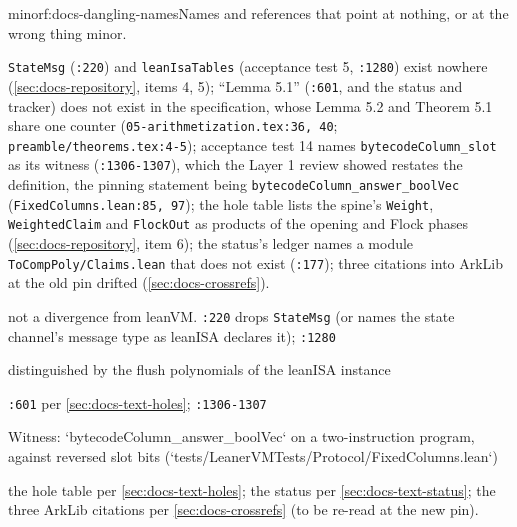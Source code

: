 \begin{finding}{minor}{f:docs-dangling-names}{Names and references that point at nothing, or at the wrong thing}
 minor.
 \begin{sloppypar}
\texttt{StateMsg} (\texttt{:\allowbreak{}220}) and \texttt{leanIsaTables} (acceptance test 5, \texttt{:\allowbreak{}1280}) exist nowhere (\cref{sec:docs-repository}, items 4, 5); ``Lemma 5.1'' (\texttt{:\allowbreak{}601}, and the status and tracker) does not exist in the specification, whose Lemma 5.2 and Theorem 5.1 share one counter (\texttt{05-\allowbreak{}arithmetization.\allowbreak{}tex:\allowbreak{}36,\allowbreak{} 40}; \texttt{preamble/\allowbreak{}theorems.\allowbreak{}tex:\allowbreak{}4-\allowbreak{}5}); acceptance test 14 names \texttt{bytecode\allowbreak{}Column\_\allowbreak{}slot} as its witness (\texttt{:\allowbreak{}1306-\allowbreak{}1307}), which the Layer 1 review showed restates the definition, the pinning statement being \texttt{bytecode\allowbreak{}Column\_\allowbreak{}answer\_\allowbreak{}bool\allowbreak{}Vec} (\texttt{Fixed\allowbreak{}Columns.\allowbreak{}lean:\allowbreak{}85,\allowbreak{} 97}); the hole table lists the spine's \texttt{Weight}, \texttt{WeightedClaim} and \texttt{FlockOut} as products of the opening and Flock phases (\cref{sec:docs-repository}, item 6); the status's ledger names a module \texttt{To\allowbreak{}Comp\allowbreak{}Poly/\allowbreak{}Claims.\allowbreak{}lean} that does not exist (\texttt{:\allowbreak{}177}); three citations into ArkLib at the old pin drifted (\cref{sec:docs-crossrefs}).
\end{sloppypar}
 not a divergence from leanVM.
 \texttt{:\allowbreak{}220} drops \texttt{StateMsg} (or names the state channel's message type as leanISA declares it); \texttt{:\allowbreak{}1280}

\begin{srccode}
distinguished by the flush polynomials of the leanISA instance
\end{srccode}

\texttt{:\allowbreak{}601} per \cref{sec:docs-text-holes}; \texttt{:\allowbreak{}1306-\allowbreak{}1307}

\begin{srccode}
Witness: `bytecodeColumn_answer_boolVec` on a two-instruction program, against reversed slot bits (`tests/LeanerVMTests/Protocol/FixedColumns.lean`)
\end{srccode}

the hole table per \cref{sec:docs-text-holes}; the status per \cref{sec:docs-text-status}; the three ArkLib citations per \cref{sec:docs-crossrefs} (to be re-read at the new pin).
\end{finding}

